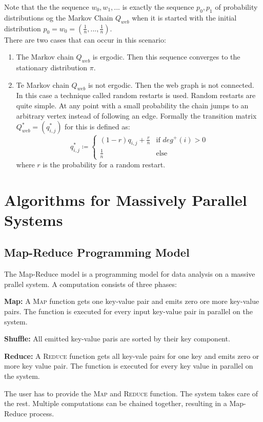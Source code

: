 \documentclass{panikzettel}
\begin{document}
Note that the the sequence $w_0,w_1,...$ is exactly the sequence $p_0,p_1$ of probability distributions og the Markov Chain $Q_{web}$ when it is started with the initial distribution $p_0=w_0=(\frac{1}{n},...,\frac{1}{n})$.\\
There are two cases that can occur in this scenario:
\begin{enumerate}
\item The Markov chain $Q_{web}$ is ergodic. Then this sequence converges to the stationary distribution $\pi$.
\item Te Markov chain $Q_{web}$ is not ergodic. Then the web graph is not connected. In this case a technique called random restarts is used. Random restarts are quite simple. At any point with a small probability the chain jumps to an arbitrary vertex instead of following an edge. Formally the transition matrix $Q_{web}^*=(q_{i,j}^*)$ for this is defined as:
\[
q_{i,j}^*\coloneqq
\begin{cases}
(1-r)q_{i,j}+\frac{r}{n} & \text{if } deg^+(i)>0\\
\frac{1}{n} & \text{else}
\end{cases}
\]
where $r$ is the probability for a random restart.
\end{enumerate}


\section{Algorithms for Massively Parallel Systems}
\subsection{Map-Reduce Programming Model}
The Map-Reduce model is a programming model for data analysis on a massive prallel system.
A computation consists of three phases:

\textbf{Map:} A \textsc{Map} function gets one key-value pair and emits zero ore more key-value pairs. The function is executed for every input key-value pair in parallel on the system.

\textbf{Shuffle:} All emitted key-value paris are sorted by their key component.

\textbf{Reduce:} A \textsc{Reduce} function gets all key-vale pairs for one key and emits zero or more key value pair. The function is executed for every key value in parallel on the system.

The user has to provide the \textsc{Map} and \textsc{Reduce} function. The system takes care of the rest.
Multiple computations can be chained together, resulting in a Map-Reduce process.
\end{document}
